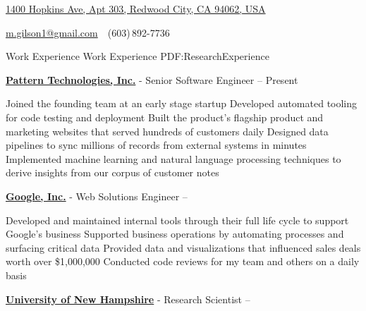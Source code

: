 \documentclass[letterpaper,MMMyyyy,nonstopmode]{simpleresumecv}
\newcommand{\CVAuthor}{Matthew Gilson, Ph.D}
\begin{document}

\Title{\CVAuthor}

\begin{SubTitle}
\href{https://www.google.com/maps/place/1400+Hopkins+Avenue,+Redwood+City,+California+994062,+USA}
{1400 Hopkins Ave, Apt 303, Redwood City, CA 94062, USA}
\par
\href{mailto:m.gilson1@gmail.com}
{m.gilson1@gmail.com}
\,\SubBulletSymbol\,
(603)\,892-7736
\end{SubTitle}

\begin{Body}


\Section
{Work Experience}
{Work Experience}
{PDF:ResearchExperience}

\Entry
\href {https://getpattern.com}{\textbf{Pattern Technologies, Inc.}}
-
Senior Software Engineer
\hfill
{} -- Present

\Gap
\begin{Detail}
\BulletItem
Joined the founding team at an early stage startup
\BulletItem
Developed automated tooling for code testing and deployment
\BulletItem
Built the product's flagship product and
marketing websites that served hundreds of customers daily
\BulletItem
Designed data pipelines to sync millions of records from external systems in minutes
\BulletItem
Implemented machine learning and natural language processing techniques to derive insights from our corpus of customer notes
\end{Detail}


\BigGap
\Entry
\href {https://google.com}{\textbf{Google, Inc.}}
-
Web Solutions Engineer
\hfill
{} -- 

\Gap
\begin{Detail}
\BulletItem
Developed and maintained internal tools through their full life cycle to support Google's business
\BulletItem
Supported business operations by automating processes and surfacing critical data
\BulletItem
Provided data and visualizations that influenced sales deals worth over \$1,000,000
\BulletItem
Conducted code reviews for my team and others on a daily basis
\end{Detail}


\BigGap
\Entry
\href {http://www.unh.edu/}{\textbf{University of New Hampshire}}
-
Research Scientist
\hfill
{} -- 


\end{Body}
\end{document}
